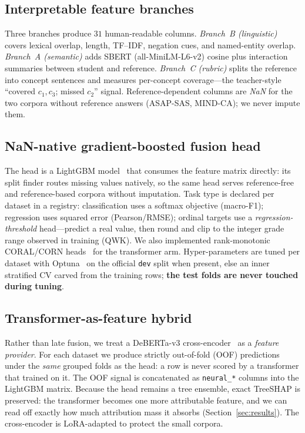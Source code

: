 \documentclass[10pt,twocolumn]{article}
\begin{document}
\subsection{Interpretable feature branches}
Three branches produce $31$ human-readable columns. \emph{Branch~B (linguistic)}
covers lexical overlap, length, TF--IDF, negation cues, and named-entity overlap.
\emph{Branch~A (semantic)} adds SBERT (all-MiniLM-L6-v2) cosine plus interaction
summaries between student and reference. \emph{Branch~C (rubric)} splits the
reference into concept sentences and measures per-concept coverage---the
teacher-style ``covered $c_1,c_3$; missed $c_2$'' signal. Reference-dependent
columns are \emph{NaN} for the two corpora without reference answers (ASAP-SAS,
MIND-CA); we never impute them.

\subsection{NaN-native gradient-boosted fusion head}
The head is a LightGBM model~\cite{ke2017lightgbm} that consumes the feature matrix
directly: its split finder routes missing values natively, so the same head serves
reference-free and reference-based corpora without imputation. Task type is
declared per dataset in a registry: classification uses a softmax objective
(macro-F1); regression uses squared error (Pearson/RMSE); ordinal targets use a
\emph{regression-threshold} head---predict a real value, then round and clip to the
integer grade range observed in training (QWK). We also implemented rank-monotonic
CORAL/CORN heads~\cite{cao2020coral,shi2023corn} for the transformer arm.
Hyper-parameters are tuned per dataset with Optuna~\cite{akiba2019optuna} on the
official \texttt{dev} split when present, else an inner stratified CV carved from
the training rows; \textbf{the test folds are never touched during tuning}.

\subsection{Transformer-as-feature hybrid}
Rather than late fusion, we treat a DeBERTa-v3 cross-encoder~\cite{he2023debertav3}
as a \emph{feature provider}. For each dataset we produce strictly out-of-fold
(OOF) predictions under the \emph{same} grouped folds as the head: a row is never
scored by a transformer that trained on it. The OOF signal is concatenated as
\texttt{neural\_*} columns into the LightGBM matrix. Because the head remains a
tree ensemble, exact TreeSHAP is preserved: the transformer becomes one more
attributable feature, and we can read off exactly how much attribution mass it
absorbs (Section~\ref{sec:results}). The cross-encoder is LoRA-adapted to protect
the small corpora.
\end{document}
